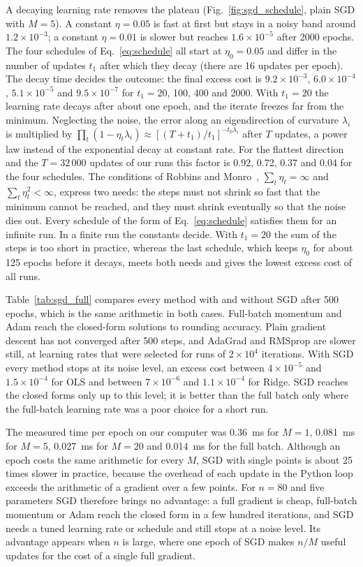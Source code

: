 \documentclass[aps,reprint,amsmath,amssymb,nofootinbib,floatfix]{revtex4-2}
\begin{document}
A decaying learning rate removes the plateau (Fig.~\ref{fig:sgd_schedule}, plain SGD with
$M=5$). A constant $\eta=0.05$ is fast at first but stays in a noisy band around
$1.2\times10^{-3}$; a constant $\eta=0.01$ is slower but reaches $1.6\times10^{-5}$ after 2000
epochs. The four schedules of Eq.~\eqref{eq:schedule} all start at $\eta_0=0.05$ and differ in
the number of updates $t_1$ after which they decay (there are 16 updates per epoch). The decay
time decides the outcome: the final excess cost is $9.2\times10^{-3}$, $6.0\times10^{-4}$,
$5.1\times10^{-5}$ and $9.5\times10^{-7}$ for $t_1=20$, 100, 400 and 2000. With $t_1=20$ the
learning rate decays after about one epoch, and the iterate freezes far from the minimum.
Neglecting the noise, the error along an eigendirection of curvature $\lambda_i$ is multiplied by
$\prod_t(1-\eta_t\lambda_i)\approx[(T+t_1)/t_1]^{-t_0\lambda_i}$ after $T$ updates, a power law
instead of the exponential decay at constant rate. For the flattest direction and the
$T=32\,000$ updates of our runs this factor is 0.92, 0.72, 0.37 and 0.04 for the four schedules.
The conditions of Robbins and Monro~\cite{robbins1951}, $\sum_t\eta_t=\infty$ and
$\sum_t\eta_t^2<\infty$, express two needs: the steps must not shrink so fast that the minimum
cannot be reached, and they must shrink eventually so that the noise dies out. Every schedule of
the form of Eq.~\eqref{eq:schedule} satisfies them for an infinite run. In a finite run the
constants decide. With $t_1=20$ the sum of the steps is too short in practice, whereas the last
schedule, which keeps $\eta_0$ for about 125 epochs before it decays, meets both needs and gives
the lowest excess cost of all runs.

Table~\ref{tab:sgd_full} compares every method with and without SGD after 500 epochs, which is
the same arithmetic in both cases. Full-batch momentum and Adam reach the closed-form solutions to
rounding accuracy. Plain gradient descent has not converged after 500 steps, and AdaGrad and
RMSprop are slower still, at learning rates that were selected for runs of $2\times10^{4}$
iterations. With SGD every method stops at its noise level, an excess cost between
$4\times10^{-5}$ and $1.5\times10^{-4}$ for OLS and between $7\times10^{-6}$ and
$1.1\times10^{-4}$ for Ridge. SGD reaches the closed forms only up to this level; it is better
than the full batch only where the full-batch learning rate was a poor choice for a short run.

The measured time per epoch on our computer was 0.36~ms for $M=1$, 0.081~ms for $M=5$, 0.027~ms
for $M=20$ and 0.014~ms for the full batch. Although an epoch costs the same arithmetic for every
$M$, SGD with single points is about 25 times slower in practice, because the overhead of each
update in the Python loop exceeds the arithmetic of a gradient over a few points. For $n=80$ and
five parameters SGD therefore brings no advantage: a full gradient is cheap, full-batch momentum
or Adam reach the closed form in a few hundred iterations, and SGD needs a tuned learning rate or
schedule and still stops at a noise level. Its advantage appears when $n$ is large, where one
epoch of SGD makes $n/M$ useful updates for the cost of a single full gradient.
\end{document}
